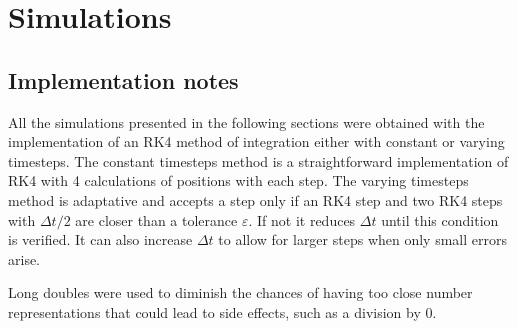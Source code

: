 \section{Simulations}

\subsection{Implementation notes}
All the simulations presented in the following sections were obtained with the implementation of an RK4 method of integration either with constant or varying timesteps. The constant timesteps method is a straightforward implementation of RK4 with 4 calculations of positions with each step. The varying timesteps method is adaptative and accepts a step only if an RK4 step and two RK4 steps with $\Delta t/ 2$ are closer than a tolerance $\varepsilon$. If not it reduces $\Delta t$ until this condition is verified. It can also increase $\Delta t$ to allow for larger steps when only small errors arise.

Long doubles were used to diminish the chances of having too close number representations that could lead to side effects, such as a division by 0.


